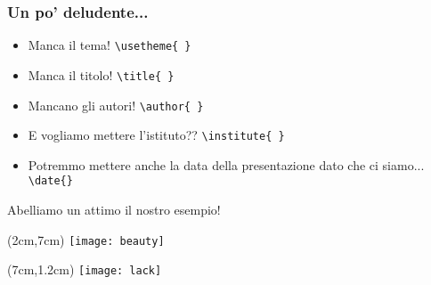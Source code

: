 \begin{frame}
 
 \frametitle{Un po' deludente...}
 
 \begin{itemize}
  \item Manca il tema! \texttt{\textbackslash usetheme\{ \}}
  \item Manca il titolo! \texttt{\textbackslash title\{ \}}
  \item Mancano gli autori! \texttt{\textbackslash author\{ \}}
  \item E vogliamo mettere l'istituto?? \texttt{\textbackslash institute\{ \}}
  \item Potremmo mettere anche la data della presentazione dato che ci siamo... 
\texttt{\textbackslash date\{\}}
 \end{itemize}
 
 Abelliamo un attimo il nostro esempio!
 
 \begin{textblock*}{5cm}(2cm,7cm)
    \texttt{[image: beauty]}
 \end{textblock*}
 
 
 \begin{textblock*}{5cm}(7cm,1.2cm)
    \texttt{[image: lack]}
 \end{textblock*}

\end{frame}
 
